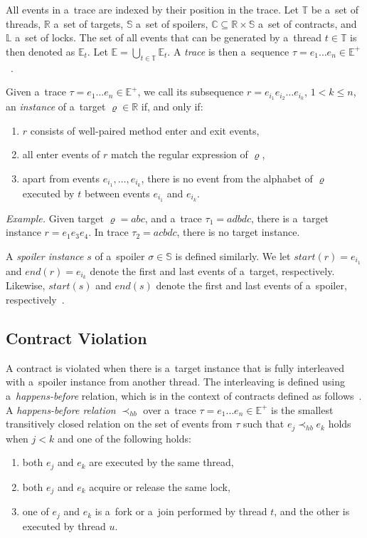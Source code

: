 All events in a~trace are indexed by their position in the trace. Let
$\mathbb{T}$ be a~set of threads, $\mathbb{R}$ a~set of targets, $\mathbb{S}$
a~set of spoilers, $\mathbb{C} \subseteq \mathbb{R} \times \mathbb{S}$ a~set of
contracts, and $\mathbb{L}$ a~set of locks. The set of all events that can be
generated by a~thread $t \in \mathbb{T}$ is then denoted as $\mathbb{E}_t$. Let
$\mathbb{E} = \bigcup_{t \in \mathbb{T}} \mathbb{E}_t$. A \emph{trace} is then
a~sequence $\tau = e_1 \hdots e_n \in \mathbb{E}^+$~\cite{contracts}.

Given a~trace $\tau = e_1 \hdots e_n \in \mathbb{E}^+$, we call its subsequence
$r = e_{i_1} e_{i_2} \hdots e_{i_k}$, $1 < k \leq n$, an \emph{instance} of
a~target $\varrho \in \mathbb{R}$ if, and only if:
\begin{enumerate}
    \item $r$ consists of well-paired method enter and exit events,
    \item all enter events of $r$ match the regular expression of $\varrho$,
    \item apart from events $e_{i_1},\ldots,e_{i_k}$, there is no event from the
        alphabet of $\varrho$ executed by $t$ between events $e_{i_1}$ and
        $e_{i_k}$.
\end{enumerate}

\medskip \noindent
\emph{Example.} Given target $\varrho = abc$, and a~trace $\tau_1 = adbdc$,
there is a~target instance $r = e_1 e_3 e_4$. In trace $\tau_2 = acbdc$, there
is no target instance.

\medskip
A \emph{spoiler instance} $s$ of a~spoiler $\sigma \in \mathbb{S}$ is defined
similarly. We let $start(r) = e_{i_1}$ and $end(r) = e_{i_k}$ denote the first
and last events of a~target, respectively. Likewise, $start(s)$ and $end(s)$
denote the first and last events of a~spoiler, respectively~\cite{contracts}.

\subsection{Contract Violation}

A contract is violated when there is a~target instance that is fully interleaved
with a~spoiler instance from another thread. The interleaving is defined using
a~\emph{happens-before} relation, which is in the context of contracts defined
as follows~\cite{contracts}. A \emph{happens-before relation} $\prec_{hb}$ over
a~trace $\tau = e_1 \ldots e_n \in \mathbb{E}^+$ is the smallest transitively
closed relation on the set of events from $\tau$ such that $e_j \prec_{hb} e_k$
holds when $j < k$ and one of the following holds:
\begin{enumerate}
    \item both $e_j$ and $e_k$ are executed by the same thread,
    \item both $e_j$ and $e_k$ acquire or release the same lock,
    \item one of $e_j$ and $e_k$ is a~fork or a~join performed by thread $t$,
        and the other is executed by thread $u$.
\end{enumerate}

